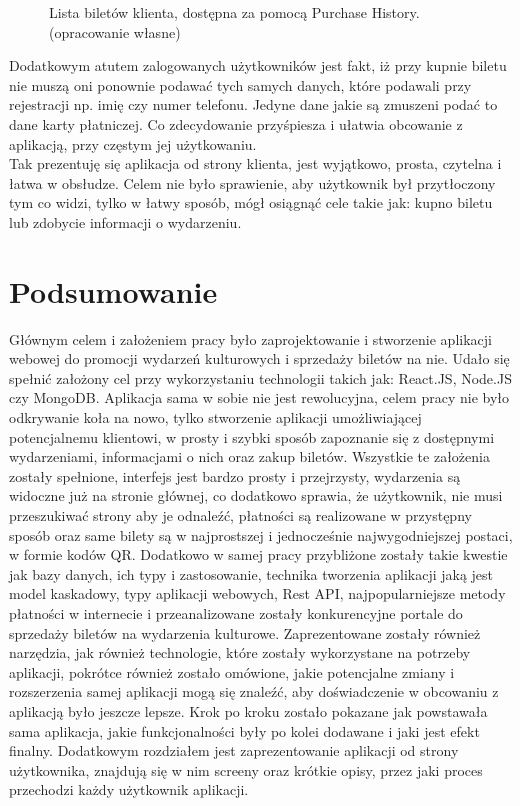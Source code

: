 \documentclass[12pt]{article}
\begin{document}
\begin{sloppypar}
{\begin{figure}[H]
    \caption{Lista biletów klienta, dostępna za pomocą Purchase History. (opracowanie własne)}
    \label{fig:purchase_his}
  \end{figure}
  Dodatkowym atutem zalogowanych użytkowników jest fakt, iż przy kupnie biletu nie muszą oni ponownie podawać tych samych danych, które podawali przy rejestracji np. imię czy numer telefonu. 
  Jedyne dane jakie są zmuszeni podać to dane karty płatniczej. Co zdecydowanie przyśpiesza i ułatwia obcowanie z aplikacją, przy częstym jej użytkowaniu.\\
  Tak prezentuję się aplikacja od strony klienta, jest wyjątkowo, prosta, czytelna i łatwa w obsłudze. 
  Celem nie było sprawienie, aby użytkownik był przytłoczony tym co widzi, tylko w łatwy sposób, mógł osiągnąć cele takie jak: kupno biletu lub zdobycie informacji o wydarzeniu.
}

\section{Podsumowanie}
{
  Głównym celem i założeniem pracy było zaprojektowanie i stworzenie aplikacji webowej do promocji wydarzeń kulturowych i sprzedaży biletów na nie. 
  Udało się spełnić założony cel przy wykorzystaniu technologii takich jak: React.JS, Node.JS czy MongoDB. 
  Aplikacja sama w sobie nie jest rewolucyjna, celem pracy nie było odkrywanie koła na nowo, 
  tylko stworzenie aplikacji umożliwiającej potencjalnemu klientowi, w prosty i szybki sposób zapoznanie się z dostępnymi wydarzeniami, informacjami o nich oraz zakup biletów. 
  Wszystkie te założenia zostały spełnione, interfejs jest bardzo prosty i przejrzysty, wydarzenia są widoczne już na stronie głównej, 
  co dodatkowo sprawia, że użytkownik, nie musi przeszukiwać strony aby je odnaleźć, 
  płatności są realizowane w przystępny sposób oraz same bilety są w najprostszej i jednocześnie najwygodniejszej postaci, w formie kodów QR. 
  Dodatkowo w samej pracy przybliżone zostały takie kwestie jak bazy danych, ich typy i zastosowanie, technika tworzenia aplikacji jaką jest model kaskadowy, typy aplikacji webowych, Rest API,
  najpopularniejsze metody płatności w internecie i przeanalizowane zostały konkurencyjne portale do sprzedaży biletów na wydarzenia kulturowe. 
  Zaprezentowane zostały również narzędzia, jak również technologie, które zostały wykorzystane na potrzeby aplikacji, pokrótce również zostało omówione, 
  jakie potencjalne zmiany i rozszerzenia samej aplikacji mogą się znaleźć, aby doświadczenie w obcowaniu z aplikacją było jeszcze lepsze. 
  Krok po kroku zostało pokazane jak powstawała sama aplikacja, jakie funkcjonalności były po kolei dodawane i jaki jest efekt finalny. 
  Dodatkowym rozdziałem jest zaprezentowanie aplikacji od strony użytkownika, znajdują się w nim screeny oraz krótkie opisy, przez jaki proces przechodzi każdy użytkownik aplikacji.
}


\end{sloppypar}
\end{document}
